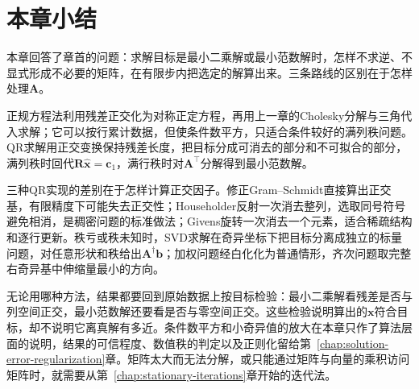 \FloatBarrier
\section{本章小结}
\label{sec:direct-least-squares-summary}

本章回答了章首的问题：求解目标是最小二乘解或最小范数解时，怎样不求逆、不显式形成不必要的矩阵，在有限步内把选定的解算出来。三条路线的区别在于怎样处理$\bm A$。

正规方程法利用残差正交化为对称正定方程，再用上一章的Cholesky分解与三角代入求解；它可以按行累计数据，但使条件数平方，只适合条件较好的满列秩问题。QR求解用正交变换保持残差长度，把目标分成可消去的部分和不可拟合的部分，满列秩时回代$\bm R\hat{\bm x}=\bm c_1$，满行秩时对$\bm A^\top$分解得到最小范数解。

三种QR实现的差别在于怎样计算正交因子。修正Gram--Schmidt直接算出正交基，有限精度下可能失去正交性；Householder反射一次消去整列，选取同号符号避免相消，是稠密问题的标准做法；Givens旋转一次消去一个元素，适合稀疏结构和逐行更新。秩亏或秩未知时，SVD求解在奇异坐标下把目标分离成独立的标量问题，对任意形状和秩给出$\bm A^\dagger\bm b$；加权问题经白化化为普通情形，齐次问题取完整右奇异基中伸缩量最小的方向。

无论用哪种方法，结果都要回到原始数据上按目标检验：最小二乘解看残差是否与列空间正交，最小范数解还要看是否与零空间正交。这些检验说明算出的$\bm x$符合目标，却不说明它离真解有多近。条件数平方和小奇异值的放大在本章只作了算法层面的说明，结果的可信程度、数值秩的判定以及正则化留给第~\ref{chap:solution-error-regularization}章。矩阵太大而无法分解，或只能通过矩阵与向量的乘积访问矩阵时，就需要从第~\ref{chap:stationary-iterations}章开始的迭代法。
